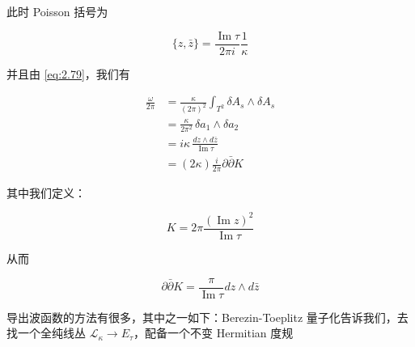 此时 Poisson 括号为

\begin{equation}
  \{z,\bar z\}=\frac{\operatorname{Im}\tau}{2\pi i}\frac{1}{\kappa}
  \tag{2.157}
  \label{eq:2.157}
\end{equation}

并且由 \eqref{eq:2.79}，我们有

\begin{equation}
  \begin{aligned}
    \frac{\omega}{2\pi}
    &=\frac{\kappa}{(2\pi)^2}\int_{T^2}\delta A_s\wedge\delta A_s\\
    &=\frac{\kappa}{2\pi^2}\,\delta a_1\wedge\delta a_2\\
    &=i\kappa\,\frac{dz\wedge d\bar z}{\operatorname{Im}\tau}\\
    &=(2\kappa)\frac{i}{2\pi}\partial\bar\partial K
  \end{aligned}
  \tag{2.158}
  \label{eq:2.158}
\end{equation}

其中我们定义：

\begin{equation}
  K=2\pi\frac{(\operatorname{Im}z)^2}{\operatorname{Im}\tau}
  \tag{2.159}
  \label{eq:2.159}
\end{equation}

从而

\begin{equation}
  \partial\bar\partial K=\frac{\pi}{\operatorname{Im}\tau}dz\wedge d\bar z
  \tag{2.160}
  \label{eq:2.160}
\end{equation}

导出波函数的方法有很多，其中之一如下：Berezin-Toeplitz 量子化告诉我们，去找一个全纯线丛 $\mathcal{L}_\kappa\to E_\tau$，配备一个不变 Hermitian 度规

